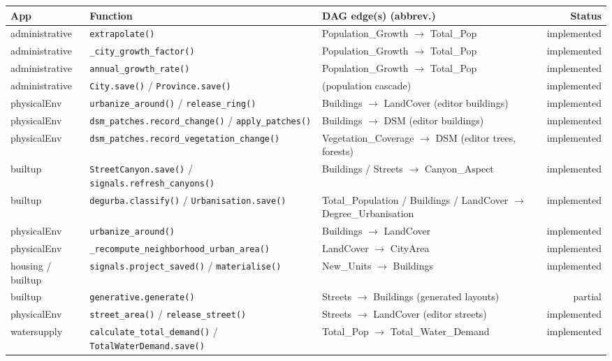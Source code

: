 \documentclass[11pt]{article}
\newcommand{\code}[1]{\texttt{#1}}
\newcommand{\statusdone}{\textcolor{green!50!black}{implemented}}
\newcommand{\statuspartial}{\textcolor{orange!80!black}{partial}}
\begin{document}
\small
\begin{xltabular}{\linewidth}{l X X r}
\toprule
\textbf{App} & \textbf{Function} & \textbf{DAG edge(s) (abbrev.)} & \textbf{Status} \\
\midrule
\endhead
administrative & \code{extrapolate()} & Population\_Growth $\to$ Total\_Pop & \statusdone{} \\
administrative & \code{\_city\_growth\_factor()} & Population\_Growth $\to$ Total\_Pop & \statusdone{} \\
administrative & \code{annual\_growth\_rate()} & Population\_Growth $\to$ Total\_Pop & \statusdone{} \\
administrative & \code{City.save()} / \code{Province.save()} & (population cascade) & \statusdone{} \\
physicalEnv & \code{urbanize\_around()} / \code{release\_ring()} & Buildings $\to$ LandCover (editor buildings) & \statusdone{} \\
physicalEnv & \code{dsm\_patches.record\_change()} / \code{apply\_patches()} & Buildings $\to$ DSM (editor buildings) & \statusdone{} \\
physicalEnv & \code{dsm\_patches.record\_vegetation\_change()} & Vegetation\_Coverage $\to$ DSM (editor trees, forests) & \statusdone{} \\
builtup & \code{StreetCanyon.save()} / \code{signals.refresh\_canyons()} & Buildings / Streets $\to$ Canyon\_Aspect & \statusdone{} \\
builtup & \code{degurba.classify()} / \code{Urbanisation.save()} & Total\_Population / Buildings / LandCover $\to$ Degree\_Urbanisation & \statusdone{} \\
physicalEnv & \code{urbanize\_around()} & Buildings $\to$ LandCover & \statusdone{} \\
physicalEnv & \code{\_recompute\_neighborhood\_urban\_area()} & LandCover $\to$ CityArea & \statusdone{} \\
housing / builtup & \code{signals.project\_saved()} / \code{materialise()} & New\_Units $\to$ Buildings & \statusdone{} \\
builtup & \code{generative.generate()} & Streets $\to$ Buildings (generated layouts) & \statuspartial{} \\
physicalEnv & \code{street\_area()} / \code{release\_street()} & Streets $\to$ LandCover (editor streets) & \statusdone{} \\
watersupply & \code{calculate\_total\_demand()} / \code{TotalWaterDemand.save()} & Total\_Pop $\to$ Total\_Water\_Demand & \statusdone{} \\

\end{xltabular}
\end{document}
